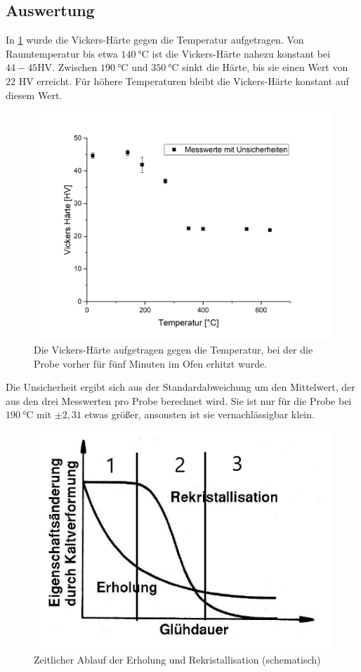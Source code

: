 \documentclass[
	a4paper,
	12pt,
	pagesize,
	ngerman
]{scrartcl}
\begin{document}
\subsection{Auswertung}

In \cref{vickers} wurde die Vickers-Härte gegen die Temperatur aufgetragen. Von Raumtemperatur bis etwa $\SI{140}{\degreeCelsius}$ ist die Vickers-Härte nahezu konstant bei $44-45$HV. Zwischen $\SI{190}{\degreeCelsius}$ und $\SI{350}{\degreeCelsius}$ sinkt die Härte, bis sie einen Wert von $22$ HV erreicht. Für höhere Temperaturen bleibt die Vickers-Härte konstant auf diesem Wert.

\begin{figure}[h]
	\centering
	\includegraphics[scale=0.6]{vickers.png}
	\caption{Die Vickers-Härte aufgetragen gegen die Temperatur, bei der die Probe vorher für fünf Minuten im Ofen erhitzt wurde.}
	\label{vickers}
\end{figure}

Die Unsicherheit ergibt sich aus der Standardabweichung um den Mittelwert, der aus den drei Messwerten pro Probe berechnet wird. Sie ist nur für die Probe bei $\SI{190}{\degreeCelsius}$ mit $\pm2,31$ etwas größer, ansonsten ist sie vernachlässigbar klein.

\begin{figure}[h]
	\centering
	\includegraphics[scale=1]{grafik1.png}
	\caption{Zeitlicher Ablauf der Erholung und Rekristallisation (schematisch)}
	\label{grafik}
\end{figure}
\end{document}
